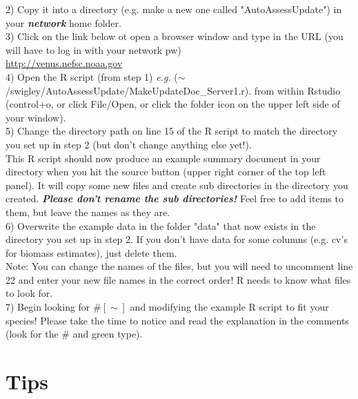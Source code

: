 \documentclass[]{report}
\begin{document}
2) Copy it into a directory (e.g. make a new one called "AutoAssessUpdate") in your \large{\textbf{\textit{network}}} \normalsize home folder.\\

3) Click on the link below ot open a browser window and type in the URL (you will have to log in with your network pw) \\

\url{http://venus.nefsc.noaa.gov} \\

4) Open the R script (from step 1) \textit{e.g.} ($\sim$/swigley/AutoAssessUpdate/MakeUpdateDoc\_Server1.r). from within Rstudio (control+o, or click File/Open, or click the folder icon on the upper left side of your window).\\

5) Change the directory path on line 15 of the R script to match the directory you set up in step 2 (but don't change anything else yet!). \\  

This R script should now produce an example summary document in your directory when you hit the source button (upper right corner of the top left panel).  It will copy some new files and create sub directories in the directory you created.  \large{\textbf{\textit{Please don't rename the sub directories!}}} \normalsize Feel free to add items to them, but leave the names as they are. \\

6) Overwrite the example data in the folder "data" that now exists in the directory you set up in step 2.  If you don't have data for some columns (e.g. cv's for biomass estimates), just delete them.  \\ \linebreak
Note: You can change the names of the files, but you will need to uncomment line 22 and enter your new file names in the correct order!  R needs to know what files to look for. \\  

7) Begin looking for $\#[\sim]$ and modifying the example R script to fit your species! Please take the time to notice and read the explanation in the comments (look for the $\#$ and green type).  \\

\section*{Tips}
\end{document}
